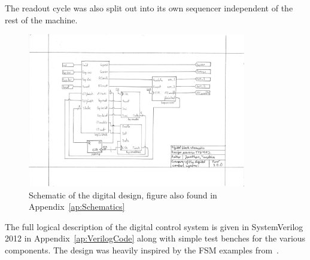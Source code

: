 The readout cycle was also split out into its own sequencer independent of the rest of the machine.

\begin{figure}[p]
  \centering
  \includegraphics[width=0.85\textwidth]{figures/SchematicDigital}
  \caption{Schematic of the digital design, figure also found in Appendix~\ref{ap:Schematics}}
  \label{fig:digschematic}
\end{figure}

The full logical description of the digital control system is given in SystemVerilog 2012 in Appendix~\ref{ap:VerilogCode} along with simple test benches for the various components.
The design was heavily inspired by the FSM examples from~\cite{DigitalBook}.